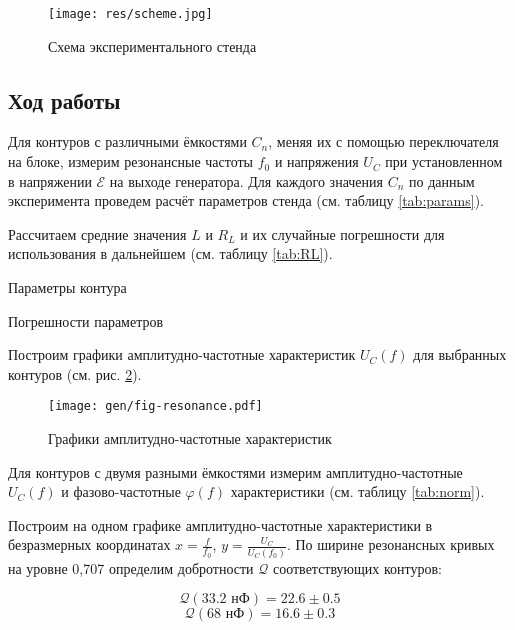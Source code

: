 \documentclass[12pt,a4paper]{article}
\begin{document}
\begin{figure}[H]
	\centering
	\texttt{[image: res/scheme.jpg]}
	\caption{Схема экспериментального стенда}
	\label{fig:scheme}
\end{figure}

	
\subsection*{Ход работы}

Для контуров с различными ёмкостями $C_n$, меняя их с помощью переключателя на блоке, измерим резонансные частоты $f_0$ и напряжения $U_C$ при установленном в напряжении $\mathscr{E}$ на выходе генератора. Для каждого значения $C_n$ по данным эксперимента проведем расчёт параметров стенда (см. таблицу \ref{tab:params}).

Рассчитаем средние значения $L$ и $R_L$ и их случайные погрешности для использования в дальнейшем (см. таблицу \ref{tab:RL}).

\begin{table}[H]
	\footnotesize
	
	\caption{Параметры контура}
	\label{tab:params}
\end{table}

\begin{table}[H]
	\footnotesize
	
	\caption{Погрешности параметров}
	\label{tab:RL}
\end{table}

Построим графики амплитудно-частотные характеристик $U_C(f)$ для выбранных контуров (см. рис. \ref{fig:resonance}).

\begin{figure}[h]
	\centering
	\texttt{[image: gen/fig-resonance.pdf]}
	\caption{Графики амплитудно-частотные характеристик}
	\label{fig:resonance}
\end{figure}

\clearpage

Для контуров с двумя разными ёмкостями измерим амплитудно-частотные $U_C(f)$ и  фазово-частотные $\varphi(f)$ характеристики (см. таблицу \ref{tab:norm}).


Построим на одном графике амплитудно-частотные характеристики в безразмерных координатах $x = \frac{f}{f_0}$, $y = \frac{U_C}{U_C(f_0)}$. По ширине резонансных кривых на уровне 0,707
определим добротности $\mathcal{Q}$ соответствующих контуров:

$$\mathcal{Q}\left(33.2 \text{ нФ}\right) = 22.6 \pm 0.5$$
$$\mathcal{Q}\left(68 \text{ нФ}\right) = 16.6 \pm 0.3$$
\end{document}
